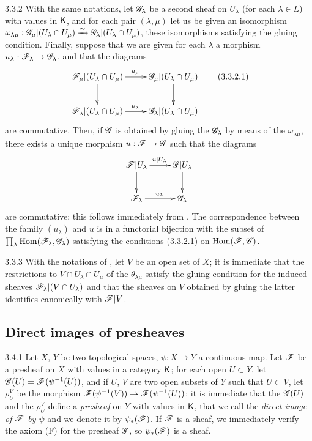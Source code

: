 \begin{env}{3.3.2}
\label{env-0.3.3.2}
With the same notations, let $\mathscr{G}_\lambda$ be a second sheaf on $U_\lambda$ (for each
$\lambda\in L$) with values in $\mathsf{K}$, and for each pair $(\lambda,\mu)$ let us be given an
isomorphism
$\omega_{\lambda\mu}:\mathscr{G}_\mu|(U_\lambda\cap U_\mu)
\xrightarrow{\sim}\mathscr{G}_\lambda|(U_\lambda\cap U_\mu)$, these isomorphisms satisfying the
gluing condition. Finally, suppose that we are given for each $\lambda$ a morphism
$u_\lambda:\mathscr{F}_\lambda\to\mathscr{G}_\lambda$, and that the diagrams
\[
  \xymatrix{
    \sh{F}_\mu|(U_\lambda\cap U_\mu)\ar[r]^{u_\mu}\ar[d] &
    \sh{G}_\mu|(U_\lambda\cap U_\mu)\ar[d]\\
    \sh{F}_\lambda|(U_\lambda\cap U_\mu)\ar[r]^{u_\lambda} &
    \sh{G}_\lambda|(U_\lambda\cap U_\mu)
  }
  \tag{3.3.2.1}
\]
are commutative. Then, if $\mathscr{G}$ is obtained by gluing the $\mathscr{G}_\lambda$ by means of the
$\omega_{\lambda\mu}$, there exists a unique morphism $u:\mathscr{F}\to\mathscr{G}$ such that the
diagrams
\[
  \xymatrix{
    \sh{F}|U_\lambda\ar[r]^{u|U_\lambda}\ar[d] &
    \sh{G}|U_\lambda\ar[d]\\
    \sh{F}_\lambda\ar[r]^{u_\lambda} &
    \sh{G}_\lambda
  }
\]
are commutative; this follows immediately from . The correspondence between
the family $(u_\lambda)$ and $u$ is in a functorial bijection with the subset of
$\prod_\lambda{\mathop{\mathrm{Hom}}\nolimits}(\mathscr{F}_\lambda,\mathscr{G}_\lambda)$ satisfying the conditions (3.3.2.1) on
${\mathop{\mathrm{Hom}}\nolimits}(\mathscr{F},\mathscr{G})$.
\end{env}

\begin{env}{3.3.3}
\label{env-0.3.3.3}
With the notations of , let $V$ be an open set of $X$; it is immediate that
the restrictions to $V\cap U_\lambda\cap U_\mu$ of the $\theta_{\lambda\mu}$ satisfy the
gluing condition for the induced sheaves $\mathscr{F}_\lambda|(V\cap U_\lambda)$ and that the
sheaves on $V$ obtained by gluing the latter identifies canonically with $\mathscr{F}|V$.
\end{env}

\subsection{Direct images of presheaves}
\label{0-prelim-3.4}

\begin{env}{3.4.1}
\label{env-0.3.4.1}
Let $X$, $Y$ be two topological spaces, $\psi:X\to Y$ a continuous map. Let $\mathscr{F}$ be a
presheaf on $X$ with values in a category $\mathsf{K}$; for each open $U\subset Y$, let
$\mathscr{G}(U)=\mathscr{F}(\psi^{-1}(U))$, and if $U$, $V$ are two open subsets of $Y$ such that
$U\subset V$, let $\rho_U^V$ be the morphism $\mathscr{F}(\psi^{-1}(V))\to\mathscr{F}(\psi^{-1}(U))$;
it is immediate that the $\mathscr{G}(U)$ and the $\rho_U^V$ define a \emph{presheaf} on $Y$ with
values in $\mathsf{K}$, that we call the \emph{direct image of $\mathscr{F}$ by $\psi$} and we denote it
by $\psi_*(\mathscr{F})$. If $\mathscr{F}$ is a sheaf, we immediately verify the axiom (F) for the
presheaf $\mathscr{G}$, so $\psi_*(\mathscr{F})$ is a sheaf.
\end{env}

